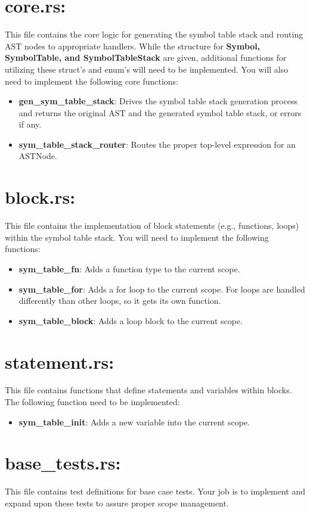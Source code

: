 \documentclass[
	12pt, %
]{fphw}
\begin{document}
\section*{core.rs:}
This file contains the core logic for generating the symbol table stack and routing AST nodes to appropriate handlers. While the structure for \textbf{Symbol, SymbolTable, and SymbolTableStack} are given, additional functions for utilizing these struct's and enum's will need to be implemented. You will also need to implement the following core functions:
\begin{itemize}
    \item \textbf{gen\_sym\_table\_stack}: Drives the symbol table stack generation process and returns the original AST and the generated symbol table stack, or errors if any.
    \item \textbf{sym\_table\_stack\_router}: Routes the proper top-level expression for an ASTNode.
\end{itemize}

\section*{block.rs:}
This file contains the implementation of block statements (e.g., functions, loops) within the symbol table stack. You will need to implement the following functions:
\begin{itemize}
    \item \textbf{sym\_table\_fn}: Adds a function type to the current scope.
    \item \textbf{sym\_table\_for}: Adds a for loop to the current scope. For loops are handled differently than other loops, so it gets its own function. 
    \item \textbf{sym\_table\_block}: Adds a loop block to the current scope. 
\end{itemize}
\pagebreak
\section*{statement.rs:}
This file contains functions that define statements and variables within blocks. The following function need to be implemented:
\begin{itemize}
    \item \textbf{sym\_table\_init}: Adds a new variable into the current scope.
\end{itemize}

\section*{base\_tests.rs:}
This file contains test definitions for base case tests. Your job is to implement and expand upon these tests to assure proper scope management. 
\end{document}
